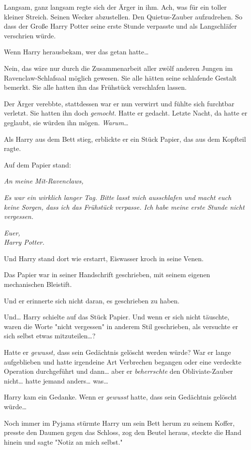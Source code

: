 {Langsam, ganz langsam regte sich der Ärger in ihm. Ach, was für ein toller kleiner Streich. Seinen Wecker abzustellen. Den Quietus-Zauber aufzudrehen. So dass der Große Harry Potter seine erste Stunde verpasste und als Langschläfer verschrien würde.

Wenn Harry herausbekam, wer das getan hatte…

Nein, das wäre nur durch die Zusammenarbeit aller zwölf anderen Jungen im Ravenclaw-Schlafsaal möglich gewesen. Sie alle hätten seine schlafende Gestalt bemerkt. Sie alle hatten ihn das Frühstück verschlafen lassen.

Der Ärger verebbte, stattdessen war er nun verwirrt und fühlte sich furchtbar verletzt. Sie hatten ihn doch \emph{gemocht.} Hatte er gedacht. Letzte Nacht, da hatte er geglaubt, sie würden ihn mögen. \emph{Warum…}

Als Harry aus dem Bett stieg, erblickte er ein Stück Papier, das aus dem Kopfteil ragte.

Auf dem Papier stand:

\emph{An meine Mit-Ravenclaws,}

\emph{Es war ein wirklich langer Tag. Bitte lasst mich ausschlafen und macht euch keine Sorgen, dass ich das Frühstück verpasse. Ich habe meine erste Stunde nicht vergessen.}

\emph{\emph{Euer,\\ Harry Potter.}}

Und Harry stand dort wie erstarrt, Eiswasser kroch in seine Venen.

Das Papier war in seiner Handschrift geschrieben, mit seinem eigenen mechanischen Bleistift.

Und er erinnerte sich nicht daran, es geschrieben zu haben.

Und… Harry schielte auf das Stück Papier. Und wenn er sich nicht täuschte, waren die Worte "nicht vergessen" in anderem Stil geschrieben, als versuchte er sich selbst etwas mitzuteilen…?

Hatte er \emph{gewusst,} dass sein Gedächtnis gelöscht werden würde? War er lange aufgeblieben und hatte irgendeine Art Verbrechen begangen oder eine verdeckte Operation durchgeführt und dann… aber er \emph{beherrschte} den Obliviate-Zauber nicht… hatte jemand anders… was…

Harry kam ein Gedanke. Wenn er \emph{gewusst} hatte, dass sein Gedächtnis gelöscht würde…

Noch immer im Pyjama stürmte Harry um sein Bett herum zu seinem Koffer, presste den Daumen gegen das Schloss, zog den Beutel heraus, steckte die Hand hinein und sagte "Notiz an mich selbst."

}

